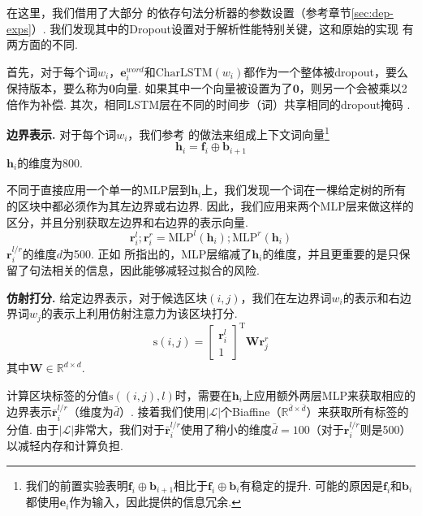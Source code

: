 在这里，我们借用了大部分 \citep{dozat-etal-2017-biaffine}的依存句法分析器的参数设置（参考章节\ref{sec:dep-exps}）.
我们发现其中的Dropout设置对于解析性能特别关键，这和原始的实现 \citep{stern-etal-2017-minimal}有两方面的不同.

首先，对于每个词$w_i$，$\mathbf{e}^{word}_i$和$\mathrm{CharLSTM}(w_i)$都作为一个整体被dropout，要么保持版本，要么称为$\mathbf{0}$向量.
如果其中一个向量被设置为了$\mathbf{0}$，则另一个会被乘以2倍作为补偿.
其次，相同LSTM层在不同的时间步（词）共享相同的dropout掩码 \citep{yarin-etal-2016-dropout}.

\noindent\textbf{边界表示.}
对于每个词$w_i$，我们参考 \citep{stern-etal-2017-minimal}的做法来组成上下文词向量\footnote{我们的前置实验表明$\mathbf{f}_i \oplus \mathbf{b}_{i+1}$相比于$\mathbf{f}_i \oplus \mathbf{b}_i$有稳定的提升. 可能的原因是$\mathbf{f}_i$和$\mathbf{b}_i$都使用$\mathbf{e}_i$作为输入，因此提供的信息冗余.}
\begin{equation}
  \mathbf{h}_i = \mathbf{f}_i \oplus \mathbf{b}_{i+1}
\end{equation}
$\mathbf{h}_i$的维度为800.

不同于直接应用一个单一的MLP层到$\mathbf{h}_i$上，我们发现一个词在一棵给定树的所有的区块中都必须作为其左边界或右边界.
因此，我们应用来两个MLP层来做这样的区分，并且分别获取左边界和右边界的表示向量.
\begin{equation}
  \label{mlp-boundaries}
  \mathbf{r}_i^{l}; \mathbf{r}_i^{r} =\mathrm{MLP}^{l} \left( \mathbf{h}_i \right); \mathrm{MLP}^{r} \left( \mathbf{h}_i \right)
\end{equation}
$\mathbf{r}_i^{l/r}$的维度$d$为500.
正如 \citep{dozat-etal-2017-biaffine}所指出的，MLP层缩减了$\mathbf{h}_i$的维度，并且更重要的是只保留了句法相关的信息，因此能够减轻过拟合的风险.

\noindent\textbf{仿射打分.}
给定边界表示，对于候选区块$(i,j)$，我们在左边界词$w_i$的表示和右边界词$w_j$的表示上利用仿射注意力为该区块打分.
\begin{equation} \label{eq:con-biaffine}
  \mathrm{s}(i,j) =  \left[
    \begin{array}{c}
      \mathbf{r}_{i}^{l} \\
      1
    \end{array}
    \right]^\mathrm{T}
  \mathbf{W} \mathbf{r}_{j}^{r}
\end{equation}
其中$\mathbf{W} \in \mathbb{R}^{d \times d}$.

计算区块标签的分值$\mathrm{s}((i,j),l)$时，需要在$\mathbf{h}_i$上应用额外两层MLP来获取相应的边界表示$\bar{\mathbf{r}}^{l/r}_i$（维度为$\bar{d}$）.
接着我们使用$|\mathcal{L}|$个Biaffine（$\mathbb{R}^{\bar{d} \times \bar{d}}$）来获取所有标签的分值.
由于$|\mathcal{L}|$非常大，我们对于$\bar{\mathbf{r}}^{l/r}_i$使用了稍小的维度$\bar{d}=100$（对于${\mathbf{r}}^{l/r}_i$则是500）以减轻内存和计算负担.

